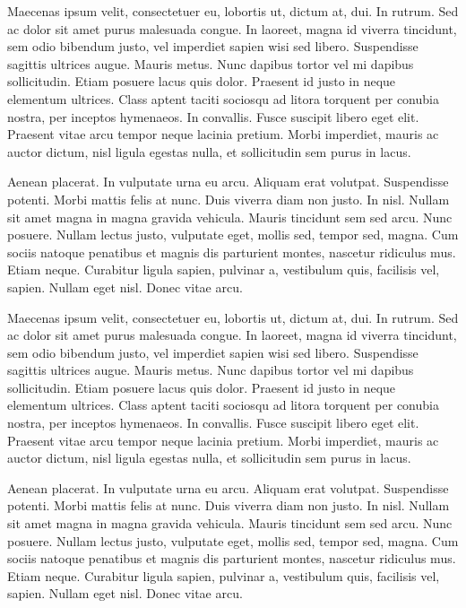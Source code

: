 Maecenas ipsum velit, consectetuer eu, lobortis ut, dictum at, dui. In rutrum. Sed ac dolor sit amet purus malesuada congue. In laoreet, magna id viverra tincidunt, sem odio bibendum justo, vel imperdiet sapien wisi sed libero. Suspendisse sagittis ultrices augue. Mauris metus. Nunc dapibus tortor vel mi dapibus sollicitudin. Etiam posuere lacus quis dolor. Praesent id justo in neque elementum ultrices. Class aptent taciti sociosqu ad litora torquent per conubia nostra, per inceptos hymenaeos. In convallis. Fusce suscipit libero eget elit. Praesent vitae arcu tempor neque lacinia pretium. Morbi imperdiet, mauris ac auctor dictum, nisl ligula egestas nulla, et sollicitudin sem purus in lacus.


Aenean placerat. In vulputate urna eu arcu. Aliquam erat volutpat. Suspendisse potenti. Morbi mattis felis at nunc. Duis viverra diam non justo. In nisl. Nullam sit amet magna in magna gravida vehicula. Mauris tincidunt sem sed arcu. Nunc posuere. Nullam lectus justo, vulputate eget, mollis sed, tempor sed, magna. Cum sociis natoque penatibus et magnis dis parturient montes, nascetur ridiculus mus. Etiam neque. Curabitur ligula sapien, pulvinar a, vestibulum quis, facilisis vel, sapien. Nullam eget nisl. Donec vitae arcu.

Maecenas ipsum velit, consectetuer eu, lobortis ut, dictum at, dui. In rutrum. Sed ac dolor sit amet purus malesuada congue. In laoreet, magna id viverra tincidunt, sem odio bibendum justo, vel imperdiet sapien wisi sed libero. Suspendisse sagittis ultrices augue. Mauris metus. Nunc dapibus tortor vel mi dapibus sollicitudin. Etiam posuere lacus quis dolor. Praesent id justo in neque elementum ultrices. Class aptent taciti sociosqu ad litora torquent per conubia nostra, per inceptos hymenaeos. In convallis. Fusce suscipit libero eget elit. Praesent vitae arcu tempor neque lacinia pretium. Morbi imperdiet, mauris ac auctor dictum, nisl ligula egestas nulla, et sollicitudin sem purus in lacus.

Aenean placerat. In vulputate urna eu arcu. Aliquam erat volutpat. Suspendisse potenti. Morbi mattis felis at nunc. Duis viverra diam non justo. In nisl. Nullam sit amet magna in magna gravida vehicula. Mauris tincidunt sem sed arcu. Nunc posuere. Nullam lectus justo, vulputate eget, mollis sed, tempor sed, magna. Cum sociis natoque penatibus et magnis dis parturient montes, nascetur ridiculus mus. Etiam neque. Curabitur ligula sapien, pulvinar a, vestibulum quis, facilisis vel, sapien. Nullam eget nisl. Donec vitae arcu.

